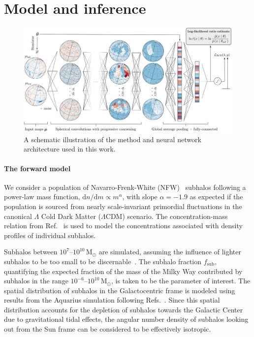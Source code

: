 \documentclass[preprint]{article}
\begin{document}
\section{Model and inference}
\label{sec:model}

\begin{figure}[!htbp]
\centering
\includegraphics[width=1.00\textwidth]{figures/summary.pdf}
\caption{A schematic illustration of the method and neural network architecture used in this work.}
\label{fig:model}
\end{figure}

\paragraph{The forward model} We consider a population of Navarro-Frenk-White (NFW)~\cite{Navarro:1995iw} subhalos following a power-law mass function, $\mathrm dn / \mathrm dm \propto m^\alpha$, with slope $\alpha = -1.9$ as expected if the population is sourced from nearly scale-invariant primordial fluctuations in the canonical $\Lambda$ Cold Dark Matter ($\Lambda$CDM) scenario. The concentration-mass relation from Ref.~\cite{Sanchez-Conde:2013yxa} is used to model the concentrations associated with density profiles of individual subhalos. 

Subhalos between $10^7$--$10^{10}\,\mathrm{M}_\odot$ are simulated, assuming the influence of lighter subhalos to be too small to be discernable~\cite{Mishra-Sharma:2020ynk}. The subhalo fraction $f_\mathrm{sub}$, quantifying the expected fraction of the mass of the Milky Way contributed by subhalos in the range $10^{-6}$--$10^{10}\,\mathrm{M}_\odot$, is taken to be the parameter of interest. The spatial distribution of subhalos in the Galactocentric frame is modeled using results from the Aquarius simulation following Refs.~\cite{Hutten:2016jko,Springel:2008cc}. Since this spatial distribution accounts for the depletion of subhalos towards the Galactic Center due to gravitational tidal effects, the angular number density of subhalos looking out from the Sun frame can be considered to be effectively isotropic.
\end{document}
